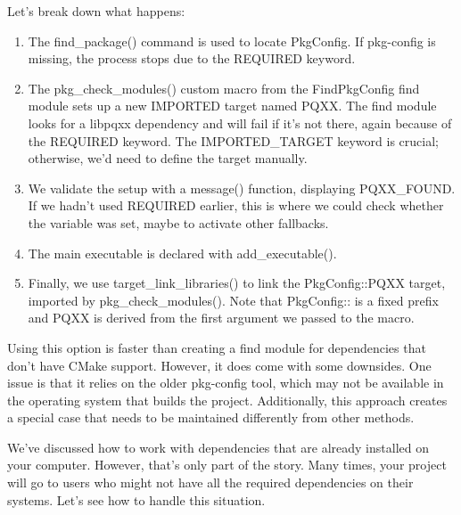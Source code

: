 
Let’s break down what happens:

\begin{enumerate}
\item
The find\_package() command is used to locate PkgConfig. If pkg-config is missing, the process stops due to the REQUIRED keyword.

\item
The pkg\_check\_modules() custom macro from the FindPkgConfig find module sets up a new IMPORTED target named PQXX. The find module looks for a libpqxx dependency and will fail if it’s not there, again because of the REQUIRED keyword. The IMPORTED\_TARGET keyword is crucial; otherwise, we’d need to define the target manually.

\item
We validate the setup with a message() function, displaying PQXX\_FOUND. If we hadn’t used REQUIRED earlier, this is where we could check whether the variable was set, maybe to activate other fallbacks.

\item
The main executable is declared with add\_executable().

\item
Finally, we use target\_link\_libraries() to link the PkgConfig::PQXX target, imported by pkg\_check\_modules(). Note that PkgConfig:: is a fixed prefix and PQXX is derived from the first argument we passed to the macro.
\end{enumerate}

Using this option is faster than creating a find module for dependencies that don’t have CMake support. However, it does come with some downsides. One issue is that it relies on the older pkg-config tool, which may not be available in the operating system that builds the project. Additionally, this approach creates a special case that needs to be maintained differently from other methods.

We’ve discussed how to work with dependencies that are already installed on your computer. However, that’s only part of the story. Many times, your project will go to users who might not have all the required dependencies on their systems. Let’s see how to handle this situation.























